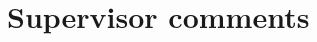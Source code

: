 \documentclass[a4paper]{report}
\begin{document}
\section{Supervisor comments}




% 
% 
\end{document}
